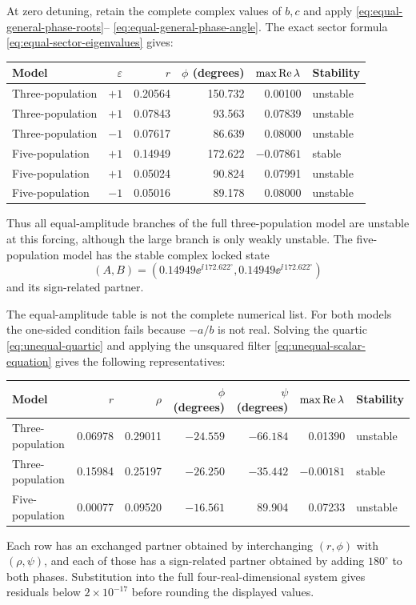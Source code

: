 At zero detuning, retain the complete complex values of $b,c$ and apply
\eqref{eq:equal-general-phase-roots}--
\eqref{eq:equal-general-phase-angle}. The exact sector formula
\eqref{eq:equal-sector-eigenvalues} gives:
\begin{center}
\begin{tabular}{@{}lrrrrl@{}}
\toprule
Model & $\varepsilon$ & $r$ & $\phi$ (degrees) & $\max\operatorname{Re}\lambda$ & Stability\\
\midrule
Three-population & $+1$ & 0.20564 & 150.732 & 0.00100 & unstable\\
Three-population & $+1$ & 0.07843 &  93.563 & 0.07839 & unstable\\
Three-population & $-1$ & 0.07617 &  86.639 & 0.08000 & unstable\\
Five-population  & $+1$ & 0.14949 & 172.622 & $-0.07861$ & stable\\
Five-population  & $+1$ & 0.05024 &  90.824 & 0.07991 & unstable\\
Five-population  & $-1$ & 0.05016 &  89.178 & 0.08000 & unstable\\
\bottomrule
\end{tabular}
\end{center}
Thus all equal-amplitude branches of the full three-population model are
unstable at this forcing, although the large branch is only weakly unstable.
The five-population model has the stable complex locked state
\begin{equation}
 (A,B)=\left(0.14949\ee^{\ii\,172.622^\circ},
              0.14949\ee^{\ii\,172.622^\circ}\right)
 \label{eq:five-complex-locked-state}
\end{equation}
and its sign-related partner.

The equal-amplitude table is not the complete numerical list.  For both
models the one-sided condition fails because $-a/b$ is not real.  Solving
the quartic \eqref{eq:unequal-quartic} and applying the unsquared filter
\eqref{eq:unequal-scalar-equation} gives the following representatives:
\begin{center}
\begin{tabular}{@{}lrrrrrl@{}}
\toprule
Model & $r$ & $\rho$ & $\phi$ (degrees) & $\psi$ (degrees) &
$\max\operatorname{Re}\lambda$ & Stability\\
\midrule
Three-population & 0.06978 & 0.29011 & $-24.559$ & $-66.184$ &
 0.01390 & unstable\\
Three-population & 0.15984 & 0.25197 & $-26.250$ & $-35.442$ &
 $-0.00181$ & stable\\
Five-population & 0.00077 & 0.09520 & $-16.561$ & 89.904 &
 0.07233 & unstable\\
\bottomrule
\end{tabular}
\end{center}
Each row has an exchanged partner obtained by interchanging
$(r,\phi)$ with $(\rho,\psi)$, and each of those has a sign-related partner
obtained by adding $180^\circ$ to both phases.  Substitution into the full
four-real-dimensional system gives residuals below $2\times10^{-17}$ before
rounding the displayed values.

